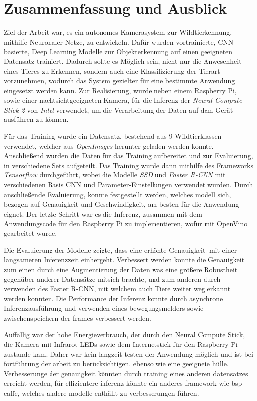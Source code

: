 \chapter{Zusammenfassung und Ausblick}\label{kap:zusammenfassungausblick}


Ziel der Arbeit war, es ein autonomes
Kamerasystem zur Wildtierkennung,
mithilfe Neuronaler Netze, zu entwickeln.
Dafür wurden vortrainierte, CNN basierte, 
Deep Learning Modelle zur Objekterkennung
auf einen geeigneten Datensatz trainiert.
Dadurch sollte es Möglich sein, nicht 
nur die Anwesenheit eines Tieres 
zu Erkennen, sondern auch eine 
Klassifizierung der Tierart 
vorzunehmen, wodurch das System
gezielter für eine bestimmte
Anwendung eingesetzt werden kann.
Zur Realisierung, wurde neben einem Raspberry
Pi, sowie einer nachtsichtgeeigneten 
Kamera, für die Inferenz der 
\textit{Neural Compute Stick 2}
von \textit{Intel} verwendet, um die 
Verarbeitung der Daten auf dem 
Gerät ausführen zu können.
\vspace{0.5cm}

Für das Training wurde ein Datensatz, 
bestehend aus 9 Wildtierklassen verwendet,
welcher aus \textit{OpenImages} herunter 
geladen werden konnte.
Anschließend wurden die Daten 
für das Training aufbereitet und
zur Evaluierung, in verschiedene 
Sets aufgeteilt.
Das Training wurde dann mithilfe des 
Frameworks \textit{Tensorflow} durchgeführt,
wobei die Modelle \textit{SSD} und
\textit{Faster R-CNN} mit verschiedenen
Basis CNN und Parameter-Einstellungen
verwendet wurden.
Durch anschließende Evaluierung, konnte 
festgestellt werden, welches modell sich,
bezogen auf Genauigkeit und Geschwindigkeit,
am besten für die Anwendung eignet.
Der letzte Schritt war es die Inferenz, zusammen 
mit dem Anwendungscode für den Raspberry Pi 
zu implementieren, wofür mit OpenVino gearbeitet 
wurde.
\vspace{0.5cm}

Die Evaluierung der Modelle zeigte, dass 
eine erhöhte Genauigkeit, mit einer 
langsameren Inferenzzeit einhergeht.
Verbessert werden konnte die Genauigkeit 
zum einen durch eine Augmentierung der Daten 
was eine größere Robustheit gegenüber anderer 
Datensätze mitsich brachte, und zum 
anderen durch verwenden des Faster 
R-CNN, mit welchem auch Tiere weiter 
weg erkannt werden konnten.
Die Performance der Inferenz konnte durch 
asynchrone Inferenzausführung und 
verwenden eines bewegungsmelders sowie 
zwischenspeichern der frames verbessert werden.
\vspace{0.5cm}


Auffällig war der hohe Energieverbrauch, 
der durch den Neural Compute Stick, die Kamera mit 
Infrarot LEDs sowie dem Internetstick für den 
Raspberry Pi zustande kam.
Daher war kein langzeit testen der Anwendung möglich 
und ist bei fortführung der arbeit zu berücksichtigen.
ebenso wie eine geeignete hülle.
Verbesserunge der genauigkeit könnten durch
 training eines anderen datensatzes erreicht 
 werden, für effizientere inferenz könnte 
 ein anderes framework wie bsp caffe, welches 
 andere modelle enthällt zu verbesserungen führen.
 
